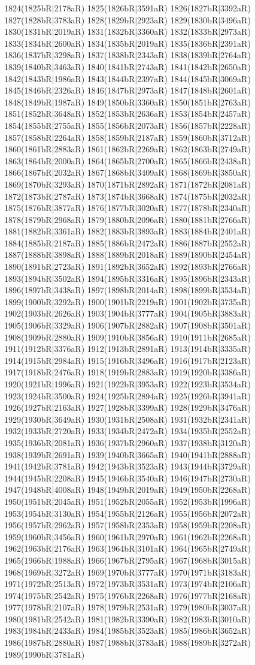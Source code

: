 1824(1825bR|2178aR) 1825(1826bR|3591aR) 1826(1827bR|3392aR) 1827(1828bR|3783aR) 1828(1829bR|2923aR) 1829(1830bR|3496aR) 1830(1831bR|2019aR) 1831(1832bR|3360aR) 1832(1833bR|2973aR) 1833(1834bR|2600aR) 1834(1835bR|2019aR) 1835(1836bR|2391aR) 1836(1837bR|3298aR) 1837(1838bR|2343aR) 1838(1839bR|2764aR) 1839(1840bR|3463aR) 1840(1841bR|2743aR) 1841(1842bR|2650aR) 1842(1843bR|1986aR) 1843(1844bR|2397aR) 1844(1845bR|3069aR) 1845(1846bR|2326aR) 1846(1847bR|2973aR) 1847(1848bR|2601aR) 1848(1849bR|1987aR) 1849(1850bR|3360aR) 1850(1851bR|2763aR) 1851(1852bR|3648aR) 1852(1853bR|2636aR) 1853(1854bR|2457aR) 1854(1855bR|2755aR) 1855(1856bR|2073aR) 1856(1857bR|2228aR) 1857(1858bR|2264aR) 1858(1859bR|2187aR) 1859(1860bR|3712aR) 1860(1861bR|2883aR) 1861(1862bR|2269aR) 1862(1863bR|2749aR) 1863(1864bR|2000aR) 1864(1865bR|2700aR) 1865(1866bR|2438aR) 1866(1867bR|2032aR) 1867(1868bR|3409aR) 1868(1869bR|3850aR) 1869(1870bR|3293aR) 1870(1871bR|2892aR) 1871(1872bR|2081aR) 1872(1873bR|2787aR) 1873(1874bR|3668aR) 1874(1875bR|2032aR) 1875(1876bR|3877aR) 1876(1877bR|3020aR) 1877(1878bR|2340aR) 1878(1879bR|2968aR) 1879(1880bR|2096aR) 1880(1881bR|2766aR) 1881(1882bR|3361aR) 1882(1883bR|3893aR) 1883(1884bR|2401aR) 1884(1885bR|2187aR) 1885(1886bR|2472aR) 1886(1887bR|2552aR) 1887(1888bR|3898aR) 1888(1889bR|2018aR) 1889(1890bR|2454aR) 1890(1891bR|2723aR) 1891(1892bR|3652aR) 1892(1893bR|2766aR) 1893(1894bR|3502aR) 1894(1895bR|3316aR) 1895(1896bR|2343aR) 1896(1897bR|3438aR) 1897(1898bR|2014aR) 1898(1899bR|3534aR) 1899(1900bR|3292aR) 1900(1901bR|2219aR) 1901(1902bR|3735aR) 1902(1903bR|2626aR) 1903(1904bR|3777aR) 1904(1905bR|3883aR) 1905(1906bR|3329aR) 1906(1907bR|2882aR) 1907(1908bR|3501aR) 1908(1909bR|2880aR) 1909(1910bR|3856aR) 1910(1911bR|2685aR) 1911(1912bR|3376aR) 1912(1913bR|2891aR) 1913(1914bR|3335aR) 1914(1915bR|2984aR) 1915(1916bR|3496aR) 1916(1917bR|2123aR) 1917(1918bR|2476aR) 1918(1919bR|2883aR) 1919(1920bR|3386aR) 1920(1921bR|1996aR) 1921(1922bR|3953aR) 1922(1923bR|3534aR) 1923(1924bR|3500aR) 1924(1925bR|2894aR) 1925(1926bR|3941aR) 1926(1927bR|2163aR) 1927(1928bR|3399aR) 1928(1929bR|3476aR) 1929(1930bR|3649aR) 1930(1931bR|2508aR) 1931(1932bR|2341aR) 1932(1933bR|2720aR) 1933(1934bR|2472aR) 1934(1935bR|2552aR) 1935(1936bR|2081aR) 1936(1937bR|2960aR) 1937(1938bR|3120aR) 1938(1939bR|2691aR) 1939(1940bR|3665aR) 1940(1941bR|2888aR) 1941(1942bR|3781aR) 1942(1943bR|3523aR) 1943(1944bR|3729aR) 1944(1945bR|2208aR) 1945(1946bR|3540aR) 1946(1947bR|2730aR) 1947(1948bR|4008aR) 1948(1949bR|2019aR) 1949(1950bR|2268aR) 1950(1951bR|2045aR) 1951(1952bR|2055aR) 1952(1953bR|1996aR) 1953(1954bR|3130aR) 1954(1955bR|2126aR) 1955(1956bR|2072aR) 1956(1957bR|2962aR) 1957(1958bR|2353aR) 1958(1959bR|2208aR) 1959(1960bR|3456aR) 1960(1961bR|2970aR) 1961(1962bR|2268aR) 1962(1963bR|2176aR) 1963(1964bR|3101aR) 1964(1965bR|2749aR) 1965(1966bR|1988aR) 1966(1967bR|2795aR) 1967(1968bR|3015aR) 1968(1969bR|3272aR) 1969(1970bR|3777aR) 1970(1971bR|3183aR) 1971(1972bR|2513aR) 1972(1973bR|3531aR) 1973(1974bR|2106aR) 1974(1975bR|2542aR) 1975(1976bR|2268aR) 1976(1977bR|2168aR) 1977(1978bR|2107aR) 1978(1979bR|2531aR) 1979(1980bR|3037aR) 1980(1981bR|2542aR) 1981(1982bR|3390aR) 1982(1983bR|3010aR) 1983(1984bR|2433aR) 1984(1985bR|3523aR) 1985(1986bR|3652aR) 1986(1987bR|2880aR) 1987(1988bR|3783aR) 1988(1989bR|3272aR) 1989(1990bR|3781aR) 